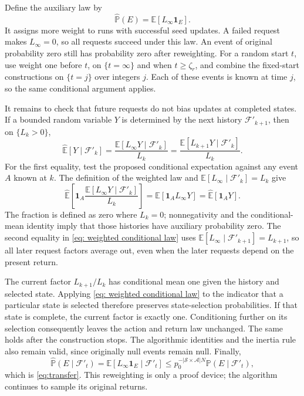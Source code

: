Define the auxiliary law by
\[
\widehat{\mathbb P}(E)=\mathbb E[L_\infty\mathbf1_E].
\]
It assigns more weight to runs with successful seed updates. A failed request makes $L_\infty=0$, so all requests succeed under this law. An event of original probability zero still has probability zero after reweighting.
For a random start $t$, use weight one before $t$, on $\{t=\infty\}$ and when $t\ge\zeta_r$, and combine the fixed-start constructions on $\{t=j\}$ over integers $j$. Each of these events is known at time $j$, so the same conditional argument applies.

It remains to check that future requests do not bias updates at completed states. If a bounded random variable $Y$ is determined by the next history $\mathcal F'_{k+1}$, then on $\{L_k>0\}$,
\begin{equation}
\label{eq: weighted conditional law}
\widehat{\mathbb E}[Y\mid\mathcal F'_k]
=\frac{\mathbb E[L_\infty Y\mid\mathcal F'_k]}{L_k}
=\frac{\mathbb E[L_{k+1}Y\mid\mathcal F'_k]}{L_k}.
\end{equation}
For the first equality, test the proposed conditional expectation against any event $A$ known at $k$. The definition of the weighted law and $\mathbb E[L_\infty\mid\mathcal F'_k]=L_k$ give
\[
\widehat{\mathbb E}\!\left[\mathbf1_A
\frac{\mathbb E[L_\infty Y\mid\mathcal F'_k]}{L_k}\right]
=\mathbb E[\mathbf1_A L_\infty Y]
=\widehat{\mathbb E}[\mathbf1_A Y].
\]
The fraction is defined as zero where $L_k=0$; nonnegativity and the conditional-mean identity imply that those histories have auxiliary probability zero. The second equality in \eqref{eq: weighted conditional law} uses $\mathbb E[L_\infty\mid\mathcal F'_{k+1}]=L_{k+1}$, so all later request factors average out, even when the later requests depend on the present return.

The current factor $L_{k+1}/L_k$ has conditional mean one given the history and selected state. Applying \eqref{eq: weighted conditional law} to the indicator that a particular state is selected therefore preserves state-selection probabilities. If that state is complete, the current factor is exactly one. Conditioning further on its selection consequently leaves the action and return law unchanged. The same holds after the construction stops. The algorithmic identities and the inertia rule also remain valid, since originally null events remain null.
Finally,
\[
\widehat{\mathbb P}(E\mid\mathcal F'_t)
=\mathbb E[L_\infty\mathbf1_E\mid\mathcal F'_t]
\le p_0^{-|\mathcal S\times\mathcal A|N}\mathbb P(E\mid\mathcal F'_t),
\]
which is \eqref{eq:transfer}. This reweighting is only a proof device; the algorithm continues to sample its original returns.
\hfill\BlackBox

